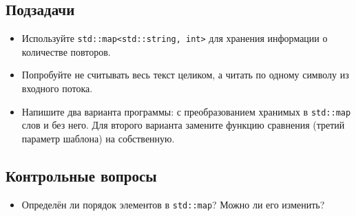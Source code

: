 \documentclass[10pt,twoside,openany]{book}
\begin{document}
\subsection*{Подзадачи}

\begin{itemize}
    \item Используйте {\tt std::map<std::string, int>} для хранения информации о количестве повторов.
    \item Попробуйте не считывать весь текст целиком, а читать по одному символу из входного потока.
    \item Напишите два варианта программы: с преобразованием хранимых в {\tt std::map} слов и без него.
          Для второго варианта замените функцию сравнения (третий параметр шаблона) на собственную.
\end{itemize}

\subsection*{Контрольные вопросы}

\begin{itemize}
    \item Определён ли порядок элементов в {\tt std::map}? Можно ли его изменить?
\end{itemize}
\end{document}
